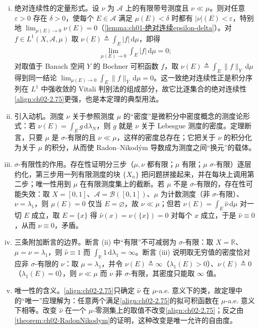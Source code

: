 \documentclass[../../main.tex]{subfiles}%
\begin{document}
\begin{remark}\label{remark:ch02-绝对连续}
\begin{enumerate}[(i)]
\item 绝对连续性的定量形式。设 $\nu$ 为 $\mathscr A$ 上的有限带号测度且 $\nu\ll\mu$。则对任意 $\varepsilon>0$ 存在 $\delta>0$，使每个 $E\in\mathscr A$ 满足 $\mu(E)<\delta$ 时都有 $|\nu|(E)<\varepsilon$，特别地 $\lim_{\mu(E)\to0}\nu(E)=0$（\cref{lemma:ch01-绝对连续epsilon-delta}）。对 $f\in L^1(X,\mathscr A,\mu)$ 取 $\nu(E)\triangleq\int_E|f|\,\mathrm{d}\mu$，即得
\begin{align*}
\lim_{\mu(E)\to0}\int_E|f|\,\mathrm{d}\mu=0;
\end{align*}
对取值于 Banach 空间 $Y$ 的 Bochner 可积函数 $f$，取 $\nu(E)\triangleq\int_E\|f\|_Y\,\mathrm{d}\mu$ 得到同一结论 $\lim_{\mu(E)\to0}\int_E\|f\|_Y\,\mathrm{d}\mu=0$。这一致绝对连续性正是积分序列在 $L^1$ 中强收敛的 Vitali 判别法的组成部分，故它比逐集合的绝对连续性\eqref{align:ch02-2.75}更强，也是本定理的典型用法。
\item 引入动机。测度 $\nu$ 关于参照测度 $\mu$ 的“密度”是微积分中密度概念的测度论形式：若 $\nu(E)=\int_Eg\,\mathrm{d}\lambda_N$，则 $g$ 就是 $\nu$ 关于 Lebesgue 测度的密度。定理断言，只要 $\mu$ 是 $\sigma$-有限的且 $\nu\ll\mu$，这样的密度总存在；它把关于 $\nu$ 的积分化为关于 $\mu$ 的积分，从而使 Radon--Nikodým 导数成为测度之间“换元”的载体。
\item $\sigma$-有限性的作用。存在性证明分三步（$\mu,\nu$ 都有限；$\mu$ 有限；$\mu$ $\sigma$-有限）逐层约化，第三步用一列有限测度的块 $\{X_n\}$ 把问题拼接起来，并在每块上调用第二步；唯一性用到 $\mu$ 在有限测度集上的截断。若 $\mu$ 不是 $\sigma$-有限的，存在性可能失效：取 $X=[0,1]$、$\mathscr A=\mathscr B([0,1])$、$\mu$ 为计数测度（非 $\sigma$-有限）、$\nu=\lambda_1$，则 $\mu(E)=0$ 仅当 $E=\varnothing$，故 $\nu\ll\mu$；但若 $\nu(E)=\int_E\hat\nu\,\mathrm{d}\mu$ 对一切 $E$ 成立，取 $E=\{x\}$ 得 $\hat\nu(x)=\nu(\{x\})=0$ 对每个 $x$ 成立，于是 $\hat\nu\equiv0$，从而 $\nu\equiv0$，矛盾。
\item 三条附加断言的边界。断言 (ii) 中“有限”不可减弱为 $\sigma$-有限：取 $X=\mathbb R$、$\mu=\nu=\lambda_1$，则 $\hat\nu\equiv1$ 而 $\int_{\mathbb R}1\,\mathrm{d}\lambda_1=\infty$。断言 (iii) 说明取无穷值的密度恰对应非 $\sigma$-有限的 $\nu$：取 $\mu=\lambda_1$，并令 $\nu(E)\triangleq\infty$（$\lambda_1(E)>0$）、$\nu(E)\triangleq0$（$\lambda_1(E)=0$），则 $\nu\ll\mu$ 而 $\nu$ 非 $\sigma$-有限，其密度只能取 $\infty$ 值。
\item 唯一性的含义。\eqref{align:ch02-2.75}只确定 $\hat\nu$ 在 $\mu$-a.e. 意义下的类，故定理中的“唯一”应理解为：任意两个满足\eqref{align:ch02-2.75}的拟可积函数在 $\mu$-a.e. 意义下相等。改变 $\hat\nu$ 在一个 $\mu$-零测集上的取值不改变\eqref{align:ch02-2.75}；反之由\cref{theorem:ch02-RadonNikodym}的证明，这种改变是唯一允许的自由度。
\end{enumerate}
\end{remark}
\end{document}
